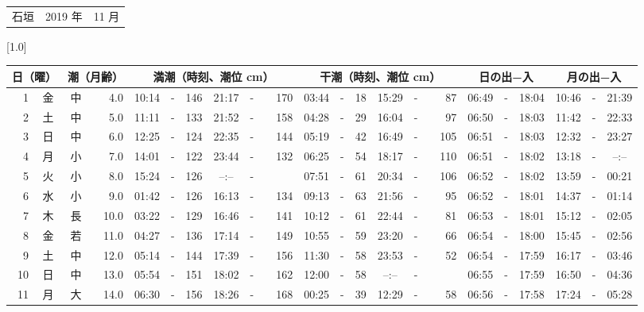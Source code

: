 \documentclass[12pt,a4j]{jsarticle}
\begin{document}
 \begin{table}[htbp]
 \begin{center}
 \begin{tabular}{lcc}
 \LARGE{石垣}  & \large{2019 年} & \large{11 月} \\
 \end{tabular}
 \end{center}
 \begin{center}
    \scalebox{0.7}[1.0]{
    \begin{tabular}{|rc|cr|ccrccr|ccrccr|ccc|ccc|}
    \hline
    \multicolumn{2}{|c|}{日（曜）} & \multicolumn{2}{c|}{潮（月齢）} & \multicolumn{6}{c|}{満潮（時刻、潮位 cm）} & \multicolumn{6}{c|}{干潮（時刻、潮位 cm）} & \multicolumn{3}{c|}{日の出−入} &  \multicolumn{3}{c|}{月の出−入}\\
 \hline
 1 & 金 & 中 &  4.0 &  10:14 &-& 146 &  21:17 &-& 170 &  03:44 &-&  18 &  15:29 &-&  87 & 06:49 & -& 18:04 & 10:46 & -& 21:39 \\
 2 & 土 & 中 &  5.0 &  11:11 &-& 133 &  21:52 &-& 158 &  04:28 &-&  29 &  16:04 &-&  97 & 06:50 & -& 18:03 & 11:42 & -& 22:33 \\
 3 & 日 & 中 &  6.0 &  12:25 &-& 124 &  22:35 &-& 144 &  05:19 &-&  42 &  16:49 &-& 105 & 06:51 & -& 18:03 & 12:32 & -& 23:27 \\
 4 & 月 & 小 &  7.0 &  14:01 &-& 122 &  23:44 &-& 132 &  06:25 &-&  54 &  18:17 &-& 110 & 06:51 & -& 18:02 & 13:18 & -& --:-- \\
 5 & 火 & 小 &  8.0 &  15:24 &-& 126 &  --:-- &-&~~~~~ &  07:51 &-&  61 &  20:34 &-& 106 & 06:52 & -& 18:02 & 13:59 & -& 00:21 \\
 6 & 水 & 小 &  9.0 &  01:42 &-& 126 &  16:13 &-& 134 &  09:13 &-&  63 &  21:56 &-&  95 & 06:52 & -& 18:01 & 14:37 & -& 01:14 \\
 7 & 木 & 長 & 10.0 &  03:22 &-& 129 &  16:46 &-& 141 &  10:12 &-&  61 &  22:44 &-&  81 & 06:53 & -& 18:01 & 15:12 & -& 02:05 \\
 8 & 金 & 若 & 11.0 &  04:27 &-& 136 &  17:14 &-& 149 &  10:55 &-&  59 &  23:20 &-&  66 & 06:54 & -& 18:00 & 15:45 & -& 02:56 \\
 9 & 土 & 中 & 12.0 &  05:14 &-& 144 &  17:39 &-& 156 &  11:30 &-&  58 &  23:53 &-&  52 & 06:54 & -& 17:59 & 16:17 & -& 03:46 \\
10 & 日 & 中 & 13.0 &  05:54 &-& 151 &  18:02 &-& 162 &  12:00 &-&  58 &  --:-- &-&~~~~~ & 06:55 & -& 17:59 & 16:50 & -& 04:36 \\
11 & 月 & 大 & 14.0 &  06:30 &-& 156 &  18:26 &-& 168 &  00:25 &-&  39 &  12:29 &-&  58 & 06:56 & -& 17:58 & 17:24 & -& 05:28 \\

\end{tabular}}
\end{center}
\end{table}
\end{document}

